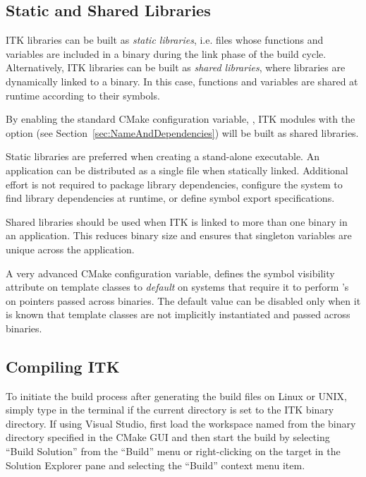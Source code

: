 \subsection{Static and Shared Libraries}
\label{sec:StaticSharedLibraries}

ITK libraries can be built as \textit{static libraries}, i.e. files whose
functions and variables are included in a binary during the link phase of
the build cycle. Alternatively, ITK libraries can be built as
\textit{shared libraries}, where libraries are dynamically linked to a
binary. In this case, functions and variables are shared at runtime according
to their symbols.

By enabling the standard CMake configuration variable,
, ITK modules with the  option
(see Section~\ref{sec:NameAndDependencies}) will be built as shared libraries.

Static libraries are preferred when creating a stand-alone executable. An
application can be distributed as a single file when statically linked.
Additional effort is not required to package library dependencies, configure the
system to find library dependencies at runtime, or define symbol export
specifications.

Shared libraries should be used when ITK is linked to more than one binary in
an application. This reduces binary size and ensures that singleton
variables are unique across the application.

A very advanced CMake configuration variable,
 defines the symbol visibility
attribute on template classes to \textit{default} on systems that require it
to perform 's on pointers passed across binaries. The
default value can be disabled only when it is known that template classes are
not implicitly instantiated and passed across binaries.


\subsection{Compiling ITK}
\label{sec:BuildITK}


To initiate the build process after generating the build files on Linux or UNIX,
simply type  in the terminal if the current directory is set to the
ITK binary directory. If using Visual Studio, first load the workspace named
 from the binary directory specified in the CMake GUI and then
start the build by selecting ``Build Solution'' from the ``Build'' menu
or right-clicking on the  target in the Solution Explorer pane
and selecting the ``Build'' context menu item.

